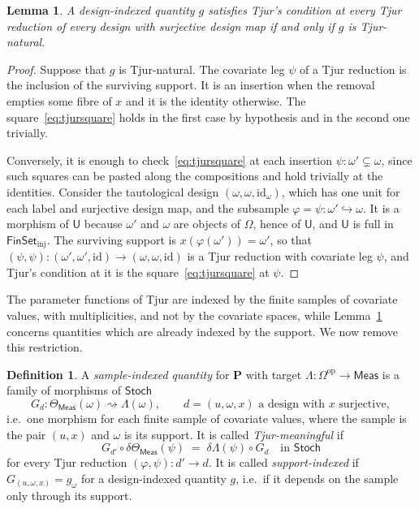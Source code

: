 \documentclass[11pt,a4paper]{article}
\theoremstyle{plain}
\newtheorem{lemma}[theorem]{Lemma}
\theoremstyle{definition}
\newtheorem{definition}[theorem]{Definition}
\theoremstyle{remark}
\newcommand{\cat}[1]{\mathsf{#1}}
\newcommand{\catU}{\cat{U}}
\newcommand{\catO}{\cat{\Omega}}
\newcommand{\Meas}{\cat{Meas}}
\newcommand{\Stoch}{\cat{Stoch}}
\newcommand{\FinSet}{\cat{FinSet}}
\newcommand{\op}{\mathrm{op}}
\newcommand{\id}{\mathrm{id}}
\newcommand{\del}{\delta}
\begin{document}
\begin{lemma}\label{lem:tjurshadow}
A design-indexed quantity $g$ satisfies Tjur's condition at every Tjur
reduction of every design with surjective design map if and only if $g$ is
Tjur-natural.
\end{lemma}

\begin{proof}
Suppose that $g$ is Tjur-natural. The covariate leg $\psi$ of a Tjur reduction
is the inclusion of the surviving support. It is an insertion when the removal
empties some fibre of $x$ and it is the identity otherwise. The
square~\eqref{eq:tjursquare} holds in the first case by hypothesis and in the
second one trivially.

Conversely, it is enough to check~\eqref{eq:tjursquare} at each insertion
$\psi \colon \omega' \subsetneq \omega$, since such squares can be pasted along
the compositions and hold trivially at the identities. Consider the
tautological design $(\omega,\omega,\id_\omega)$, which has one unit for each
label and surjective design map, and the subsample
$\varphi = \psi \colon \omega' \hookrightarrow \omega$. It is a morphism of
$\catU$ because $\omega'$ and $\omega$ are objects of $\catO$, hence of
$\catU$, and $\catU$ is full in $\FinSet_{\mathrm{inj}}$. The surviving
support is $x(\varphi(\omega')) = \omega'$, so that
$(\psi,\psi) \colon (\omega',\omega',\id) \to (\omega,\omega,\id)$ is a Tjur
reduction with covariate leg $\psi$, and Tjur's condition at it is the
square~\eqref{eq:tjursquare} at $\psi$.
\end{proof}

The parameter functions of Tjur are indexed by the finite samples of covariate
values, with multiplicities, and not by the covariate spaces, while
Lemma~\ref{lem:tjurshadow} concerns quantities which are already indexed by the
support. We now remove this restriction.

\begin{definition}\label{def:sampleindexed}
A \emph{sample-indexed quantity} for $\mathbf P$ with target
$\Lambda \colon \catO^{\op} \to \Meas$ is a family of morphisms of $\Stoch$
\[
G_{d} \colon \Theta_\Meas(\omega) \rightsquigarrow \Lambda(\omega),
\qquad d = (u,\omega,x) \text{ a design with } x \text{ surjective},
\]
i.e.\ one morphism for each finite sample of covariate values, where the
sample is the pair $(u,x)$ and $\omega$ is its support. It is called
\emph{Tjur-meaningful} if
\begin{equation}\label{eq:sampletjur}
G_{d'} \circ \del\Theta_\Meas(\psi) \;=\; \del\Lambda(\psi) \circ G_{d}
\quad\text{in } \Stoch
\end{equation}
for every Tjur reduction $(\varphi,\psi) \colon d' \to d$. It is called
\emph{support-indexed} if $G_{(u,\omega,x)} = g_{\omega}$ for a design-indexed
quantity $g$, i.e.\ if it depends on the sample only through its support.
\end{definition}
\end{document}
